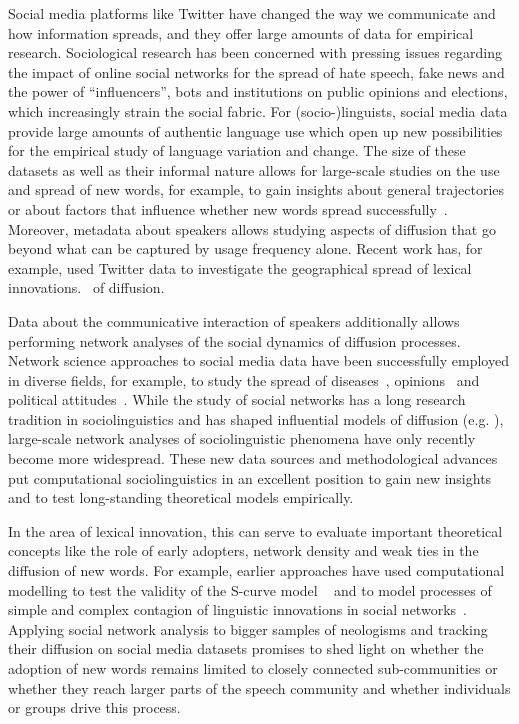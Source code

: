 \documentclass[a4paper, abstract=on]{scrartcl}
\begin{document}
  Social media platforms like Twitter have changed the way we communicate and how information spreads, and they offer large amounts of data for empirical research. Sociological research has been concerned with pressing issues regarding the impact of online social networks for the spread of hate speech, fake news and the power of \enquote{influencers}, bots and institutions on public opinions and elections, which increasingly strain the social fabric. For (socio-)linguists, social media data provide large amounts of authentic language use which open up new possibilities for the empirical study of language variation and change. The size of these datasets as well as their informal nature allows for large-scale studies on the use and spread of new words, for example, to gain insights about general trajectories~\parencite{Nini2017} or about factors that influence whether new words spread successfully~\parencite{Grieve2018b}. Moreover, metadata about speakers allows studying aspects of diffusion that go beyond what can be captured by usage frequency alone. Recent work has, for example, used Twitter data to investigate the geographical spread of lexical innovations.~\parencite{Eisenstein2014,Grieve2017,Grieve2018} of diffusion.

  Data about the communicative interaction of speakers additionally allows performing network analyses of the social dynamics of diffusion processes. Network science approaches to social media data have been successfully employed in diverse fields, for example, to study the spread of diseases~\parencite{Lu2018}, opinions~\parencite{West2014} and political attitudes~\parencite{Pew-Research-Center2019}. While the study of social networks has a long research tradition in sociolinguistics and has shaped influential models of diffusion (e.g. \cite{Milroy1985}), large-scale network analyses of sociolinguistic phenomena have only recently become more widespread. These new data sources and methodological advances put computational sociolinguistics in an excellent position to gain new insights and to test long-standing theoretical models empirically.

  In the area of lexical innovation, this can serve to evaluate important theoretical concepts like the role of early adopters, network density and weak ties in the diffusion of new words. For example, earlier approaches have used computational modelling to test the validity of the S-curve model ~\parencite{Blythe2012} and to model processes of simple and complex contagion of linguistic innovations in social networks~\parencite{Goel2016}. Applying social network analysis to bigger samples of neologisms and tracking their diffusion on social media datasets promises to shed light on whether the adoption of new words remains limited to closely connected sub-communities or whether they reach larger parts of the speech community and whether individuals or groups drive this process.
\end{document}
